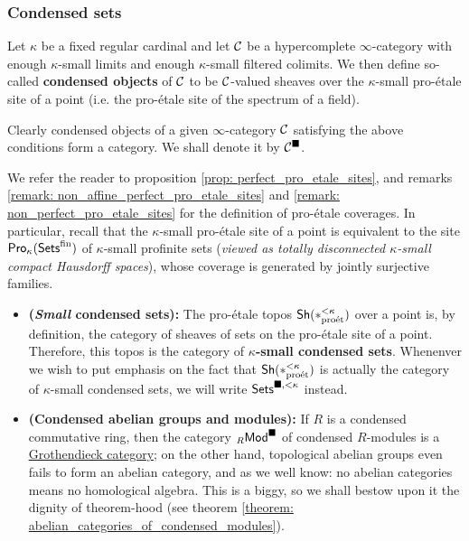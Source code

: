             \subsubsection{Condensed sets}
                \begin{definition}[Condensation] \label{def: condensation}
                    Let $\kappa$ be a fixed regular cardinal and let $\mathcal{C}$ be a hypercomplete $\infty$-category with enough $\kappa$-small limits and enough $\kappa$-small filtered colimits. We then define so-called \textbf{condensed objects} of $\mathcal{C}$ to be $\mathcal{C}$-valued sheaves over the $\kappa$-small pro-\'etale site of a point (i.e. the pro-\'etale site of the spectrum of a field). 
                    
                    Clearly condensed objects of a given $\infty$-category $\mathcal{C}$ satisfying the above conditions form a category. We shall denote it by $\mathcal{C}^{\blacksquare}$.
                \end{definition}
                \begin{remark}
                    We refer the reader to proposition \ref{prop: perfect_pro_etale_sites}, and remarks \ref{remark: non_affine_perfect_pro_etale_sites} and \ref{remark: non_perfect_pro_etale_sites} for the definition of pro-\'etale coverages. In particular, recall that the $\kappa$-small pro-\'etale site of a point is equivalent to the site $\mathsf{Pro}_{\kappa}(\mathsf{Sets}^{\mathrm{fin}})$ of $\kappa$-small profinite sets (\textit{viewed as totally disconnected $\kappa$-small compact Hausdorff spaces}), whose coverage is generated by jointly surjective families. 
                \end{remark}
                \begin{example}
                    \noindent
                    \begin{itemize}
                        \item \textbf{(\textit{Small} condensed sets):} The pro-\'etale topos $\mathsf{Sh}(*_{\mathrm{pro\acute{e}t}}^{< \kappa})$ over a point is, by definition, the category of sheaves of sets on the pro-\'etale site of a point. Therefore, this topos is the category of \textbf{$\kappa$-small condensed sets}. Whenenver we wish to put emphasis on the fact that $\mathsf{Sh}(*_{\mathrm{pro\acute{e}t}}^{< \kappa})$ is actually the category of $\kappa$-small condensed sets, we will write $\mathsf{Sets}^{\blacksquare, < \kappa}$ instead.
                        \item \textbf{(Condensed abelian groups and modules):} If $R$ is a condensed commutative ring, then the category ${}_R\mathsf{Mod}^{\blacksquare}$ of condensed $R$-modules is a \href{https://ncatlab.org/nlab/show/Grothendieck+category}{\underline{Grothendieck category}}; on the other hand, topological abelian groups even fails to form an abelian category, and as we well know: no abelian categories means no homological algebra. This is a biggy, so we shall bestow upon it the dignity of theorem-hood (see theorem \ref{theorem: abelian_categories_of_condensed_modules}).
                    \end{itemize}
                \end{example}
